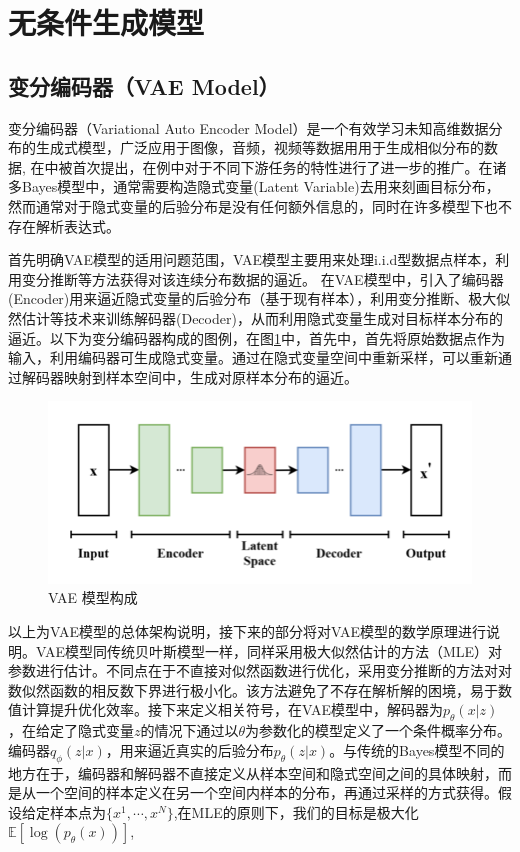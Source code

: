\section{无条件生成模型}
\subsection{变分编码器（VAE Model）}
变分编码器（Variational Auto Encoder Model）是一个有效学习未知高维数据分布的生成式模型，广泛应用于图像，音频，视频等数据用用于生成相似分布的数据, 在\cite{vae_model}中被首次提出，在例\cite{VAE_diffusion}中对于不同下游任务的特性进行了进一步的推广。在诸多Bayes模型中，通常需要构造隐式变量(Latent Variable)去用来刻画目标分布，然而通常对于隐式变量的后验分布是没有任何额外信息的，同时在许多模型下也不存在解析表达式。\par 
首先明确VAE模型的适用问题范围，VAE模型主要用来处理i.i.d型数据点样本，利用变分推断等方法获得对该连续分布数据的逼近。
在VAE模型中，引入了编码器(Encoder)用来逼近隐式变量的后验分布（基于现有样本），利用变分推断、极大似然估计等技术来训练解码器(Decoder)，从而利用隐式变量生成对目标样本分布的逼近。以下为变分编码器构成的图例，在图\ref{VAE model fig}中，首先中，首先将原始数据点作为输入，利用编码器可生成隐式变量。通过在隐式变量空间中重新采样，可以重新通过解码器映射到样本空间中，生成对原样本分布的逼近。
\begin{figure}[H]
    \centering
    \includegraphics[scale = 0.7]{Picture/VAE.png}
    \caption{VAE 模型构成}
    \label{VAE model fig}
\end{figure}
以上为VAE模型的总体架构说明，接下来的部分将对VAE模型的数学原理进行说明。VAE模型同传统贝叶斯模型一样，同样采用极大似然估计的方法（MLE）对参数进行估计。不同点在于不直接对似然函数进行优化，采用变分推断的方法对对数似然函数的相反数下界进行极小化。该方法避免了不存在解析解的困境，易于数值计算提升优化效率。接下来定义相关符号，在VAE模型中，解码器为$p_{\theta}(x|z)$，在给定了隐式变量$z$的情况下通过以$\theta$为参数化的模型定义了一个条件概率分布。编码器$q_{\phi}(z|x)$，用来逼近真实的后验分布$p_{\theta}(z|x)$。与传统的Bayes模型不同的地方在于，编码器和解码器不直接定义从样本空间和隐式空间之间的具体映射，而是从一个空间的样本定义在另一个空间内样本的分布，再通过采样的方式获得。假设给定样本点为$\{x^1,\cdots,x^{N}\}$,在MLE的原则下，我们的目标是极大化$\mathbb{E}[\log(p_{\theta}(x))]$,
